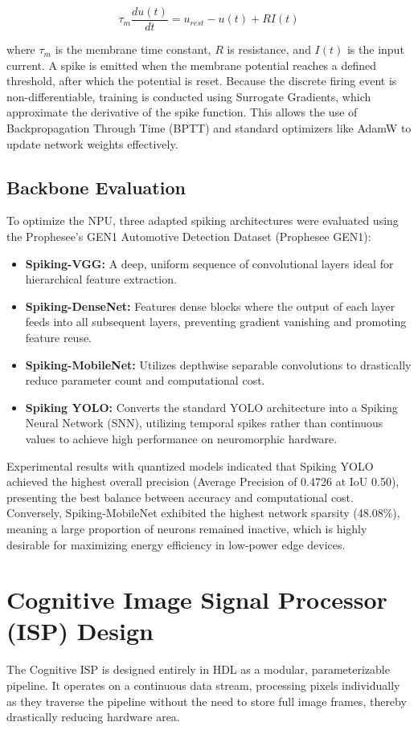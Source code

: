 \documentclass[conference]{IEEEtran}
\begin{document}
\begin{equation}
\tau_m \frac{du(t)}{dt} = u_{rest} - u(t) + RI(t)
\end{equation}

where $\tau_m$ is the membrane time constant, $R$ is resistance, and $I(t)$ is the input current. A spike is emitted when the membrane potential reaches a defined threshold, after which the potential is reset. Because the discrete firing event is non-differentiable, training is conducted using Surrogate Gradients, which approximate the derivative of the spike function. This allows the use of Backpropagation Through Time (BPTT) and standard optimizers like AdamW to update network weights effectively.

\subsection{Backbone Evaluation}
To optimize the NPU, three adapted spiking architectures were evaluated using the Prophesee’s GEN1 Automotive Detection Dataset (Prophesee GEN1):
\begin{itemize}
    \item \textbf{Spiking-VGG:} A deep, uniform sequence of convolutional layers ideal for hierarchical feature extraction.
    \item \textbf{Spiking-DenseNet:} Features dense blocks where the output of each layer feeds into all subsequent layers, preventing gradient vanishing and promoting feature reuse.
    \item \textbf{Spiking-MobileNet:} Utilizes depthwise separable convolutions to drastically reduce parameter count and computational cost.
    \item \textbf{Spiking YOLO:} Converts the standard YOLO architecture into a Spiking Neural Network (SNN), utilizing temporal spikes rather than continuous values to achieve high performance on neuromorphic hardware.
\end{itemize}

Experimental results with quantized models indicated that Spiking YOLO achieved the highest overall precision (Average Precision of 0.4726 at IoU 0.50), presenting the best balance between accuracy and computational cost. Conversely, Spiking-MobileNet exhibited the highest network sparsity (48.08\%), meaning a large proportion of neurons remained inactive, which is highly desirable for maximizing energy efficiency in low-power edge devices.

\section{Cognitive Image Signal Processor (ISP) Design}
The Cognitive ISP is designed entirely in HDL as a modular, parameterizable pipeline. It operates on a continuous data stream, processing pixels individually as they traverse the pipeline without the need to store full image frames, thereby drastically reducing hardware area.
\end{document}
